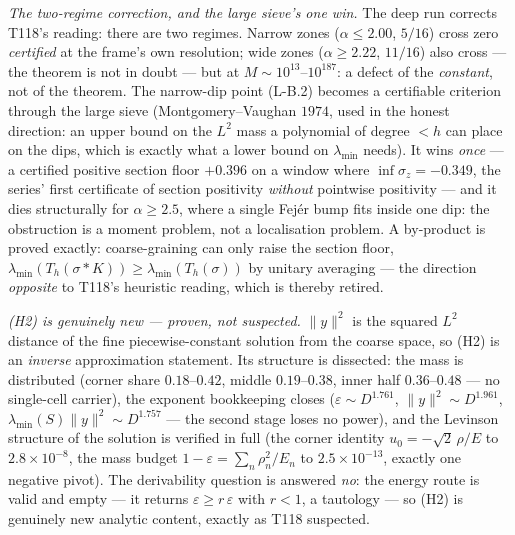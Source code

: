 \documentclass[11pt,a4paper]{article}
\begin{document}
\emph{The two-regime correction, and the large sieve's one win.} The deep run corrects T118's
reading: there are two regimes. Narrow zones ($\alpha\le2.00$, $5/16$) cross zero
\emph{certified} at the frame's own resolution; wide zones ($\alpha\ge2.22$, $11/16$) also
cross --- the theorem is not in doubt --- but at $M\sim10^{13}$--$10^{187}$: a defect of the
\emph{constant}, not of the theorem. The narrow-dip point (L-B.2) becomes a certifiable
criterion through the large sieve (Montgomery--Vaughan $1974$, used in the honest direction:
an upper bound on the $L^2$ mass a polynomial of degree $<h$ can place on the dips, which is
exactly what a lower bound on $\lambda_{\min}$ needs). It wins \emph{once} --- a certified
positive section floor $+0.396$ on a window where $\inf\sigma_z=-0.349$, the series' first
certificate of section positivity \emph{without} pointwise positivity --- and it dies
structurally for $\alpha\ge2.5$, where a single Fej\'er bump fits inside one dip: the
obstruction is a moment problem, not a localisation problem. A by-product is proved exactly:
coarse-graining can only raise the section floor,
$\lambda_{\min}(T_h(\sigma*K))\ge\lambda_{\min}(T_h(\sigma))$ by unitary averaging --- the
direction \emph{opposite} to T118's heuristic reading, which is thereby retired.

\emph{(H2) is genuinely new --- proven, not suspected.} $\|y\|^2$ is the squared $L^2$
distance of the fine piecewise-constant solution from the coarse space, so (H2) is an
\emph{inverse} approximation statement. Its structure is dissected: the mass is distributed
(corner share $0.18$--$0.42$, middle $0.19$--$0.38$, inner half $0.36$--$0.48$ --- no
single-cell carrier), the exponent bookkeeping closes ($\varepsilon\sim D^{1.761}$,
$\|y\|^2\sim D^{1.961}$, $\lambda_{\min}(S)\|y\|^2\sim D^{1.757}$ --- the second stage loses
no power), and the Levinson structure of the solution is verified in full (the corner identity
$u_0=-\sqrt2\,\rho/E$ to $2.8\times10^{-8}$, the mass budget $1-\varepsilon=\sum_n\rho_n^2/E_n$
to $2.5\times10^{-13}$, exactly one negative pivot). The derivability question is answered
\emph{no}: the energy route is valid and empty --- it returns $\varepsilon\ge r\,\varepsilon$
with $r<1$, a tautology --- so (H2) is genuinely new analytic content, exactly as T118
suspected.
\end{document}
